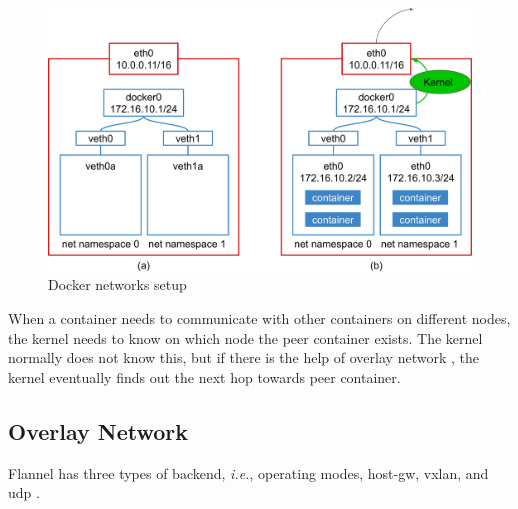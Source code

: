 \begin{figure}[h]
  \centering
  \includegraphics[width=0.8\columnwidth]{Figs/bridge+veth}

  \par\bigskip
  \centering
  \begin{minipage}{0.9\columnwidth}
    \caption[Docker networks setup]{
      Docker networks setup
    }
    \label{fig:bridge+veth}
  \end{minipage}
\end{figure}
 
When a container needs to communicate with other containers on different nodes, the kernel needs to know on which node the peer container exists.
The kernel normally does not know this, but if there is the help of overlay network \cite{zismer2016performance}, the kernel eventually finds out the next hop towards peer container.

\FloatBarrier

\subsection{Overlay Network}


Flannel has three types of backend, {\it i.e.}, operating modes, host-gw, vxlan, and udp \cite{CoreOSFlannelBackend}.

